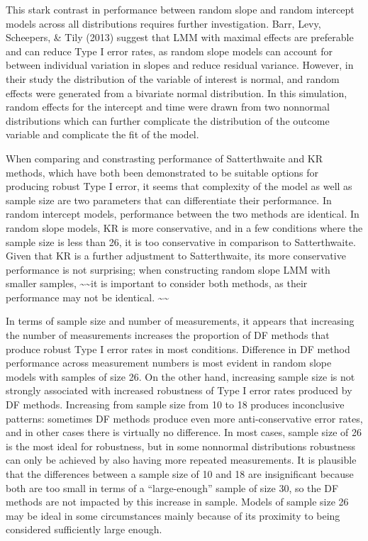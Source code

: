 \documentclass[12pt, twoside]{amherstthesis}
\begin{document}
This stark contrast in performance between random slope and random intercept models across all distributions requires further investigation. Barr, Levy, Scheepers, \& Tily (2013) suggest that LMM with maximal effects are preferable and can reduce Type I error rates, as random slope models can account for between individual variation in slopes and reduce residual variance. However, in their study the distribution of the variable of interest is normal, and random effects were generated from a bivariate normal distribution. In this simulation, random effects for the intercept and time were drawn from two nonnormal distributions which can further complicate the distribution of the outcome variable and complicate the fit of the model.

When comparing and constrasting performance of Satterthwaite and KR methods, which have both been demonstrated to be suitable options for producing robust Type I error, it seems that complexity of the model as well as sample size are two parameters that can differentiate their performance. In random intercept models, performance between the two methods are identical. In random slope models, KR is more conservative, and in a few conditions where the sample size is less than 26, it is too conservative in comparison to Satterthwaite. Given that KR is a further adjustment to Satterthwaite, its more conservative performance is not surprising; when constructing random slope LMM with smaller samples, \textasciitilde\textasciitilde it is important to consider both methods, as their performance may not be identical. \textasciitilde\textasciitilde{}

In terms of sample size and number of measurements, it appears that increasing the number of measurements increases the proportion of DF methods that produce robust Type I error rates in most conditions. Difference in DF method performance across measurement numbers is most evident in random slope models with samples of size 26. On the other hand, increasing sample size is not strongly associated with increased robustness of Type I error rates produced by DF methods. Increasing from sample size from 10 to 18 produces inconclusive patterns: sometimes DF methods produce even more anti-conservative error rates, and in other cases there is virtually no difference. In most cases, sample size of 26 is the most ideal for robustness, but in some nonnormal distributions robustness can only be achieved by also having more repeated measurements. It is plausible that the differences between a sample size of 10 and 18 are insignificant because both are too small in terms of a ``large-enough'' sample of size 30, so the DF methods are not impacted by this increase in sample. Models of sample size 26 may be ideal in some circumstances mainly because of its proximity to being considered sufficiently large enough.
\end{document}
